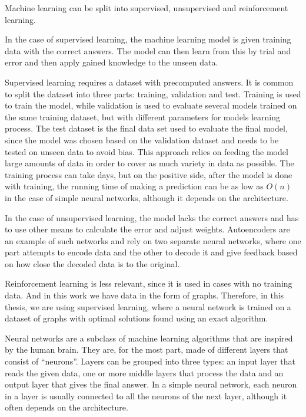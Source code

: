 Machine learning can be split into supervised, unsupervised and reinforcement learning. 

In the case of supervised learning, the machine learning model is given training data with the correct answers. The model can then learn from this by trial and error and then apply gained knowledge to the unseen data. 

Supervised learning requires a dataset with precomputed answers. It is common to split the dataset into three parts: training, validation and test. Training is used to train the model, while validation is used to evaluate several models trained on the same training dataset, but with different parameters for models learning process. The test dataset is the final data set used to evaluate the final model, since the model was chosen based on the validation dataset and needs to be tested on unseen data to avoid bias. This approach relies on feeding the model large amounts of data in order to cover as much variety in data as possible. The training process can take days, but on the positive side, after the model is done with training, the running time of making a prediction can be as low as $O(n)$ in the case of simple neural networks, although it depends on the architecture. 

In the case of unsupervised learning, the model lacks the correct answers and has to use other means to calculate the error and adjust weights. Autoencoders are an example of such networks and rely on two separate neural networks, where one part attempts to encode data and the other to decode it and give feedback based on how close the decoded data is to the original. 

Reinforcement learning is less relevant, since it is used in cases with no training data. And in this work we have data in the form of graphs. Therefore, in this thesis, we are using supervised learning, where a neural network is trained on a dataset of graphs with optimal solutions found using an exact algorithm. 

Neural networks are a subclass of machine learning algorithms that are inspired by the human brain. They are, for the most part, made of different layers that consist of “neurons”. Layers can be grouped into three types: an input layer that reads the given data, one or more middle layers that process the data and an output layer that gives the final answer. In a simple neural network, each neuron in a layer is usually connected to all the neurons of the next layer, although it often depends on the architecture. 

